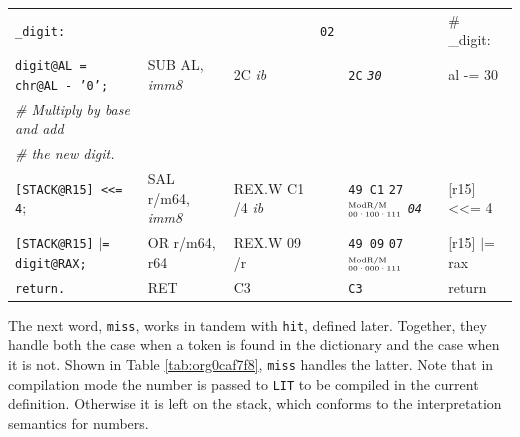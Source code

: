 \documentclass[a4paper,12pt,final]{article}
\begin{document}
\begin{table}[!htbp]
\begin{adjustwidth}{-1cm}{-1cm}
\begin{center}
\begin{tabular}{l|ll|l|lH}
\texttt{\_digit:} &  &  & \texttt{02} &  & \# \_digit:\\[0pt]
\hspace{1.053000em} \texttt{digit@AL = chr@AL - '0';} & SUB AL, \emph{imm8} & 2C \emph{ib} &  & \texttt{2C} \emph{\texttt{30}} & al -= 30\\[0pt]
\hspace{1.053000em} \emph{\# Multiply by base and add} &  &  &  &  & \\[0pt]
\hspace{1.053000em} \emph{\# the new digit.} &  &  &  &  & \\[0pt]
\hspace{1.053000em} \texttt{[STACK@R15] <{}<{}= 4}; & SAL r/m64, \emph{imm8} & REX.W C1 /​4 \emph{ib} &  & \texttt{49 C1} \texttt{27}​\(^{\text{\tiny ModR/M}}_{\text{\tiny 00·100·111}}\) \emph{\texttt{04}} & [r15] <<= 4\\[0pt]
\hspace{1.053000em} \texttt{[STACK@R15]} \(\vert{}\)​\texttt{= digit@RAX;} & OR r/m64, r64 & REX.W 09 /r &  & \texttt{49 09} \texttt{07}​\(^{\text{\tiny ModR/M}}_{\text{\tiny 00·000·111}}\) & [r15] \(\vert{}\)= rax\\[0pt]
\hspace{1.053000em} \texttt{return.} & RET & C3 &  & \texttt{C3} & return\\[0pt]
\end{tabular}

\end{center}
\normalsize \end{adjustwidth} \end{table} \vspace{0}

The next word, \texttt{miss}, works in tandem with \texttt{hit}, defined later.
Together, they handle both the case when a token is found in the
dictionary and the case when it is not.  Shown in Table
\ref{tab:org0caf7f8}, \texttt{miss} handles the latter.  Note that in compilation
mode the number is passed to \texttt{LIT} to be compiled in the current
definition.  Otherwise it is left on the stack, which conforms to the
interpretation semantics for numbers.
\end{document}
